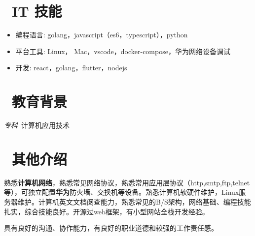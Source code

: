 \documentclass{resume}
\begin{document}

\section{\faCogs\ IT 技能}
\begin{itemize}[parsep=0.5ex]
  \item 编程语言: golang，javascript（es6，typescript），python
  \item 平台工具: Linux， Mac，vscode，docker-compose，华为网络设备调试
  \item 开发: react，golang，flutter，nodejs
\end{itemize}


\section{\faGraduationCap\  教育背景}
\textit{专科}\ 计算机应用技术

\section{\faSunO\ 其他介绍}


熟悉\textbf{计算机网络}，熟悉常见网络协议，熟悉常用应用层协议（http,smtp,ftp,telnet等），可独立配置\textbf{华为}防火墙、交换机等设备。熟悉计算机软硬件维护，Linux服务器维护。计算机英文文档阅查能力，熟悉常见的B/S架构，网络基础、编程技能扎实，综合技能良好。开源过web框架，有小型网站全栈开发经验。

具有良好的沟通、协作能力，有良好的职业道德和较强的工作责任感。
%
%
\end{document}
